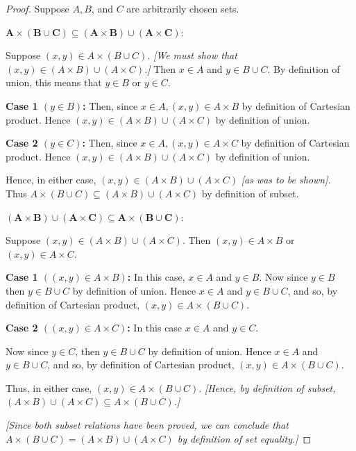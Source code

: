 \documentclass[14pt]{extarticle}
\begin{document}
\begin{proof}
Suppose $A, B$, and $C$ are arbitrarily chosen sets.

\(\bm{A \times (B \cup C) \subseteq (A \times B) \cup (A \times C)}\): 

Suppose \((x, y) \in A \times (B \cup C)\). {\it [We must show that \((x, y) \in (A \times B) \cup (A \times C)\).]} 
Then \(x \in A\) and \(y \in B \cup C\). By definition of union, this means that \(y \in B\) or \(y \in C\).

{\bf Case 1 \((y \in B)\):} Then, since \(x \in A, (x, y) \in A \times B\) by definition of Cartesian product. Hence 
\((x, y) \in (A \times B) \cup (A \times C)\) by definition of union.

{\bf Case 2 \((y \in C)\):} Then, since \(x \in A, (x, y) \in A \times C\) by definition of Cartesian product. Hence 
\((x, y) \in (A \times B) \cup (A \times C)\) by definition of union.

Hence, in either case, \((x, y) \in (A \times B) \cup (A \times C)\) {\it [as was to be shown].} Thus 
\(A \times (B \cup C) \subseteq (A \times B) \cup (A \times C)\) by definition of subset.

\(\bm{(A \times B) \cup (A \times C) \subseteq A \times (B \cup C):}\) 

Suppose \((x, y) \in (A \times B) \cup (A \times C)\). Then \((x, y) \in A \times B\) or \((x, y) \in A \times C\).

{\bf Case 1 \(((x, y) \in A \times B)\):} In this case, \(x \in A\) and \(y \in B\). Now since \(y \in B\) then 
\(y \in B \cup C\) by definition of union. Hence \(x \in A\) and \(y \in B \cup C\), and so, by definition of 
Cartesian product, \((x, y) \in A \times (B \cup C)\).

{\bf Case 2 \(((x, y) \in A \times C)\):} In this case \(x \in A\) and \(y \in C\).

Now since \(y \in C\), then \(y \in B \cup C\) by definition of union. Hence \(x \in A\) and \(y \in B \cup C\), 
and so, by definition of Cartesian product, \((x, y) \in A \times (B \cup C)\). 

Thus, in either case, \((x, y) \in A \times (B \cup C)\). {\it [Hence, by definition of subset, \((A \times B) \cup (A \times C ) \subseteq A \times (B \cup C)\).]}

{\it [Since both subset relations have been proved, we can conclude that \(A \times (B \cup C) = (A \times B) \cup 
(A \times C)\) by definition of set equality.]}
\end{proof}
\end{document}
